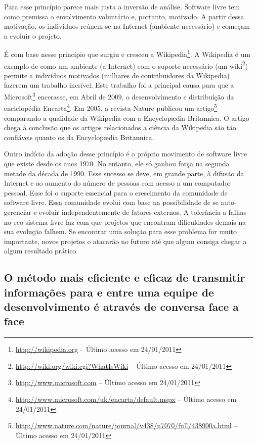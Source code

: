 Para esse princípio parece mais justa a inversão de análise. Software
livre tem como premissa o envolvimento voluntário e, portanto,
motivado. A partir dessa motivação, os indivíduos reúnem-se na
Internet (ambiente necessário) e começam a evoluir o projeto.

É com base nesse princípio que surgiu e cresceu a
Wikipedia\footnote{\url{http://wikipedia.org} -- Último acesso em
  24/01/2011}. A Wikipedia é um exemplo de como um ambiente (a
Internet) com o suporte necessário (um
wiki\footnote{\url{http://wiki.org/wiki.cgi?WhatIsWiki} -- Último
  acesso em 24/01/2011}) permite a indivíduos motivados (milhares de
contribuidores da Wikipedia) fazerem um trabalho incrível. Este
trabalho foi a principal causa para que a
Microsoft\footnote{\url{http://www.microsoft.com} -- Último acesso em
  24/01/2011} encerasse, em Abril de 2009, o desenvolvimento e
distribuição da enciclopédia
Encarta\footnote{\url{http://www.microsoft.com/uk/encarta/default.mspx}
  -- Último acesso em 24/01/2011}. Em 2005, a revista Nature publicou
um
artigo\footnote{\url{http://www.nature.com/nature/journal/v438/n7070/full/438900a.html}
  -- Último acesso em 24/01/2011} comparando a qualidade da Wikipedia
com a Encyclop{\ae}dia Britannica. O artigo chega à conclusão que os
artigos relacionados a ciência da Wikipedia são tão confiáveis quanto
os da Encyclop{\ae}dia Britannica.

Outro indício da adoção desse princípio é o próprio movimento de
software livre que existe desde os anos 1970. No entanto, ele só
ganhou força na segunda metade da década de 1990. Esse sucesso se
deve, em grande parte, à difusão da Internet e ao aumento do número de
pessoas com acesso a um computador pessoal. Esse foi o suporte
essencial para o crescimento da comunidade de software livre. Essa
comunidade evolui com base na possibilidade de se auto-gerenciar e
evoluir independentemente de fatores externos. A tolerância a falhas
no eco-sistema livre faz com que projetos que encontram dificuldades
demais na sua evolução falhem. Se encontrar uma solução para esse
problema for muito importante, novos projetos o atacarão no futuro até
que algum consiga chegar a algum resultado prático.

\subsection[Conversa face a face]{O método mais eficiente e eficaz de
  transmitir informações para e entre uma equipe de desenvolvimento é
  através de conversa face a face}

